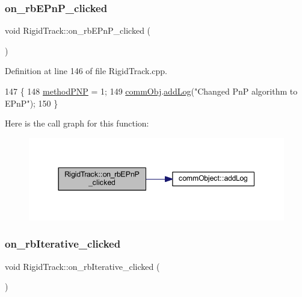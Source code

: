 \subsubsection{\texorpdfstring{on\+\_\+rb\+E\+Pn\+P\+\_\+clicked}{on\_rbEPnP\_clicked}}
{\footnotesize\ttfamily void Rigid\+Track\+::on\+\_\+rb\+E\+Pn\+P\+\_\+clicked (\begin{DoxyParamCaption}{ }\end{DoxyParamCaption})\hspace{0.3cm}{\ttfamily [slot]}}



Definition at line 146 of file Rigid\+Track.\+cpp.


\begin{DoxyCode}
147 \{
148     \hyperlink{main_8cpp_ab5e634b66221f494504aea1557af5df9}{methodPNP} = 1;
149     \hyperlink{main_8cpp_af29e7fc07ae0979d5fb61b473241d33d}{commObj}.\hyperlink{classcomm_object_aec354c7099b3039083cc4224e071e022}{addLog}(\textcolor{stringliteral}{"Changed PnP algorithm to EPnP"});
150 \}
\end{DoxyCode}
Here is the call graph for this function\+:\nopagebreak
\begin{figure}[H]
\begin{center}
\leavevmode
\includegraphics[width=344pt]{class_rigid_track_a19bc46333f946e589184eeed998160da_cgraph}
\end{center}
\end{figure}
\mbox{\label{class_rigid_track_ae5bcdd3fb7203b4a7d1fa97c1460af31}} 
\subsubsection{\texorpdfstring{on\+\_\+rb\+Iterative\+\_\+clicked}{on\_rbIterative\_clicked}}
{\footnotesize\ttfamily void Rigid\+Track\+::on\+\_\+rb\+Iterative\+\_\+clicked (\begin{DoxyParamCaption}{ }\end{DoxyParamCaption})\hspace{0.3cm}{\ttfamily [slot]}}



